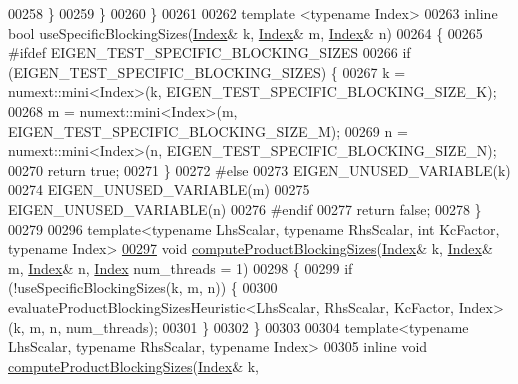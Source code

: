 \begin{DoxyCode}
00258     \}
00259   \}
00260 \}
00261 
00262 \textcolor{keyword}{template} <\textcolor{keyword}{typename} Index>
00263 \textcolor{keyword}{inline} \textcolor{keywordtype}{bool} useSpecificBlockingSizes(\hyperlink{namespace_eigen_a62e77e0933482dafde8fe197d9a2cfde}{Index}& k, \hyperlink{namespace_eigen_a62e77e0933482dafde8fe197d9a2cfde}{Index}& m, \hyperlink{namespace_eigen_a62e77e0933482dafde8fe197d9a2cfde}{Index}& n)
00264 \{
00265 \textcolor{preprocessor}{#ifdef EIGEN\_TEST\_SPECIFIC\_BLOCKING\_SIZES}
00266   \textcolor{keywordflow}{if} (EIGEN\_TEST\_SPECIFIC\_BLOCKING\_SIZES) \{
00267     k = numext::mini<Index>(k, EIGEN\_TEST\_SPECIFIC\_BLOCKING\_SIZE\_K);
00268     m = numext::mini<Index>(m, EIGEN\_TEST\_SPECIFIC\_BLOCKING\_SIZE\_M);
00269     n = numext::mini<Index>(n, EIGEN\_TEST\_SPECIFIC\_BLOCKING\_SIZE\_N);
00270     \textcolor{keywordflow}{return} \textcolor{keyword}{true};
00271   \}
00272 \textcolor{preprocessor}{#else}
00273   EIGEN\_UNUSED\_VARIABLE(k)
00274   EIGEN\_UNUSED\_VARIABLE(m)
00275   EIGEN\_UNUSED\_VARIABLE(n)
00276 \textcolor{preprocessor}{#endif}
00277   \textcolor{keywordflow}{return} \textcolor{keyword}{false};
00278 \}
00279 
00296 \textcolor{keyword}{template}<\textcolor{keyword}{typename} LhsScalar, \textcolor{keyword}{typename} RhsScalar, \textcolor{keywordtype}{int} KcFactor, \textcolor{keyword}{typename} Index>
\hyperlink{namespace_eigen_1_1internal_a85af7f706f2ecd66aaa5a088fc32cbcc}{00297} \textcolor{keywordtype}{void} \hyperlink{namespace_eigen_1_1internal_a85af7f706f2ecd66aaa5a088fc32cbcc}{computeProductBlockingSizes}(\hyperlink{namespace_eigen_a62e77e0933482dafde8fe197d9a2cfde}{Index}& k, \hyperlink{namespace_eigen_a62e77e0933482dafde8fe197d9a2cfde}{Index}& m, 
      \hyperlink{namespace_eigen_a62e77e0933482dafde8fe197d9a2cfde}{Index}& n, \hyperlink{namespace_eigen_a62e77e0933482dafde8fe197d9a2cfde}{Index} num\_threads = 1)
00298 \{
00299   \textcolor{keywordflow}{if} (!useSpecificBlockingSizes(k, m, n)) \{
00300     evaluateProductBlockingSizesHeuristic<LhsScalar, RhsScalar, KcFactor, Index>(k, m, n, num\_threads);
00301   \}
00302 \}
00303 
00304 \textcolor{keyword}{template}<\textcolor{keyword}{typename} LhsScalar, \textcolor{keyword}{typename} RhsScalar, \textcolor{keyword}{typename} Index>
00305 \textcolor{keyword}{inline} \textcolor{keywordtype}{void} \hyperlink{namespace_eigen_1_1internal_a85af7f706f2ecd66aaa5a088fc32cbcc}{computeProductBlockingSizes}(\hyperlink{namespace_eigen_a62e77e0933482dafde8fe197d9a2cfde}{Index}& k, 

\end{DoxyCode}
